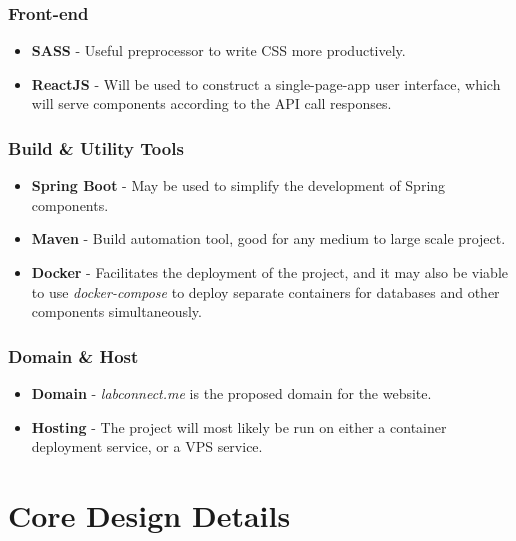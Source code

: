 \documentclass[a4paper, 12pt]{article}
\begin{document}
    \subsubsection{Front-end}
    
    \begin{itemize}
        \item \textbf{SASS} - Useful preprocessor to write CSS more productively.
        \item \textbf{ReactJS} - Will be used to construct a single-page-app user interface,
              which will serve components according to the API call responses.
    \end{itemize}
    
    \subsubsection{Build \& Utility Tools}
    
    \begin{itemize}
        \item \textbf{Spring Boot} - May be used to simplify the development of Spring components.
        \item \textbf{Maven} - Build automation tool, good for any medium to large scale project.
        \item \textbf{Docker} - Facilitates the deployment of the project, and it may
              also be viable to use \textit{docker-compose} to deploy separate containers
              for databases and other components simultaneously.
    \end{itemize}
    
    \subsubsection{Domain \& Host}
    
    \begin{itemize}
        \item \textbf{Domain} - \textit{labconnect.me} is the proposed domain for the website.
        \item \textbf{Hosting} - The project will most likely be run on either a container deployment service,
              or a VPS service.
    \end{itemize}
    
    \pagebreak

    \section{Core Design Details}
    
\end{document}
